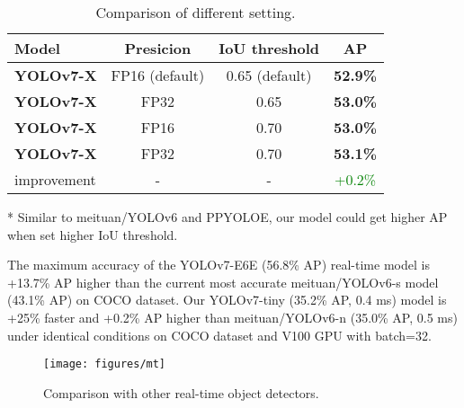 \documentclass[10pt,twocolumn,letterpaper]{article}
\begin{document}
		\begin{table}[h]
		\centering
		\begin{threeparttable}[h]
			\footnotesize
			\caption{Comparison of different setting.}
			\label{table:set}
\begin{tabular}{lccc}
				\toprule
				\textbf{Model} & \textbf{Presicion} & \textbf{IoU threshold} & \textbf{AP} \\	
				\midrule
				\textbf{YOLOv7-X} & FP16 (default) & 0.65 (default) & \textbf{52.9\%}  \\
				\textbf{YOLOv7-X} & FP32 & 0.65 & \textbf{53.0\%}  \\
				\textbf{YOLOv7-X} & FP16 & 0.70 & \textbf{53.0\%}  \\
				\textbf{YOLOv7-X} & FP32 & 0.70 & \textbf{53.1\%}  \\
				improvement & - & - & \textcolor{green}{+0.2\%}  \\
				\bottomrule
			\end{tabular}
			\begin{tablenotes}[flushleft]
			\footnotesize
			\item[*] Similar to meituan/YOLOv6 and PPYOLOE, our model could get higher AP when set higher IoU threshold.
			\end{tablenotes}
		\end{threeparttable}
		\vspace{-5mm}
		\end{table}
	
		The maximum accuracy of the YOLOv7-E6E (56.8\% AP) real-time model is +13.7\% AP higher than the current most accurate meituan/YOLOv6-s model (43.1\% AP) on COCO dataset.	Our YOLOv7-tiny (35.2\% AP, 0.4 ms) model is +25\% faster and +0.2\% AP higher than meituan/YOLOv6-n (35.0\% AP, 0.5 ms) under identical conditions on COCO dataset and V100 GPU with batch=32.
	


		\begin{figure}[h]
			\begin{center}
				\texttt{[image: figures/mt]}
			\end{center}
			\caption{Comparison with other real-time object detectors.}
			\label{fig:mt}
\end{figure}
		
		
		
		


		\clearpage
		\clearpage
		\clearpage
		
\end{document}
